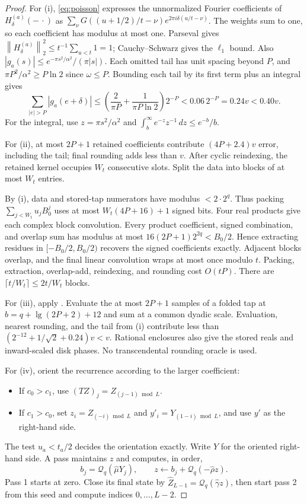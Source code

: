 \documentclass[11pt]{article}
\theoremstyle{definition}
\newcommand{\Quant}{\mathcal{Q}}
\newcommand{\norm}[1]{\left\lVert #1 \right\rVert}
\newcommand{\abs}[1]{\left\lvert #1 \right\rvert}
\begin{document}
\begin{proof}
For (i), \eqref{eq:poisson} expresses the unnormalized Fourier coefficients
of $H_\delta^{(a)}(-\,\cdot)$ as
$\sum_\nu G((u+1/2)/t-\nu)e^{2\pi i\delta(u/t-\nu)}$.
The weights sum to one, so each coefficient has modulus at most one.
Parseval gives $\norm{H_\delta^{(a)}}_2^2\le t^{-1}\sum_{u<t}1=1$;
Cauchy--Schwarz gives the $\ell_1$ bound.
Also $\abs{g_a(s)}\le e^{-\pi s^2/\alpha^2}/(\pi\abs{s})$.
Each omitted tail has unit spacing beyond $P$, and
$\pi P^2/\alpha^2\ge P\ln2$ since $\omega\le P$.
Bounding each tail by its first term plus an integral gives
\[
 \sum_{\abs{e}>P}\abs{g_a(e+\delta)}
 \le\left(\frac2{\pi P}+\frac1{\pi P\ln2}\right)2^{-P}
 <0.06\,2^{-P}=0.24v<0.40v.
\]
For the integral, use $z=\pi s^2/\alpha^2$ and
$\int_b^\infty e^{-z}z^{-1}\,dz\le e^{-b}/b$.

For (ii), at most $2P+1$ retained coefficients contribute
$(4P+2.4)v$ error, including the tail; final rounding adds less than $v$.
After cyclic reindexing, the retained kernel occupies $W_t$ consecutive slots.
Split the data into blocks of at most $W_t$ entries.

By (i), data and stored-tap numerators have modulus $<2\cdot2^q$.
Thus packing $\sum_{j<W_t}u_jB_0^j$ uses at most $W_t(4P+16)+1$ signed bits.
Four real products give each complex block convolution.
Every product coefficient, signed combination, and overlap sum has modulus
at most $16(2P+1)2^{2q}<B_0/2$.
Hence extracting residues in $[-B_0/2,B_0/2)$ recovers the signed coefficients
exactly.
Adjacent blocks overlap, and the final linear convolution wraps at most once
modulo $t$. Packing, extraction, overlap-add, reindexing, and rounding cost
$O(tP)$. There are $\lceil t/W_t\rceil\le2t/W_t$ blocks.

For (iii), apply .
Evaluate the at most $2P+1$ samples of a folded tap at
$b=q+\lg(2P+2)+12$ and sum at a common dyadic scale.
Evaluation, nearest rounding, and the tail from (i) contribute less than
$(2^{-12}+1/\sqrt2+0.24)v<v$.
Rational enclosures also give the stored reals and inward-scaled disk phases.
No transcendental rounding oracle is used.

For (iv), orient the recurrence according to the larger coefficient:
\begin{itemize}[leftmargin=*,nosep]
\item If $c_0>c_1$, use $(TZ)_j=Z_{(j-1)\bmod L}$.
\item If $c_1>c_0$, set $z_i=Z_{(-i)\bmod L}$ and
$y'_i=Y_{(1-i)\bmod L}$, and use $y'$ as the right-hand side.
\end{itemize}
The test $u_a<t_a/2$ decides the orientation exactly.
Write $Y$ for the oriented right-hand side.
A pass maintains $z$ and computes, in order,
\[
 b_j=\Quant_q(\hat\mu Y_j),\qquad
 z\leftarrow b_j+\Quant_q(-\hat\rho z).
\]
Pass 1 starts at zero. Close its final state by
$\widehat Z_{L-1}=\Quant_q(\hat\gamma z)$, then start pass 2 from this seed
and compute indices $0,\ldots,L-2$.


\end{proof}
\end{document}
